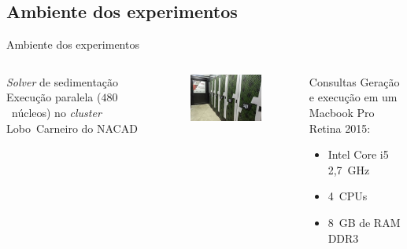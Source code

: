 \documentclass[12pt,compress]{beamer}
\begin{document}
\subsection*{Ambiente dos experimentos}
\begin{frame}{Ambiente dos experimentos}

\begin{columns}[t]


\vspace{-.7cm}

\begin{block}{\textit{Solver} de sedimentação}
Execução paralela ($480$~núcleos) no \textit{cluster} Lobo~Carneiro do NACAD\footnotemark{}
\end{block}

\begin{figure}
\includegraphics[width=\textwidth]{img/loboc.jpg}
\end{figure}

\pause


\vspace{-.7cm}

\begin{block}{Consultas}
Geração e execução em um Macbook Pro Retina 2015:

\begin{itemize}
\item Intel Core i5 2,7~GHz
\item 4~CPUs
\item 8~GB de RAM DDR3
\end{itemize}
\end{block}


\end{columns}
\end{frame}
\end{document}
